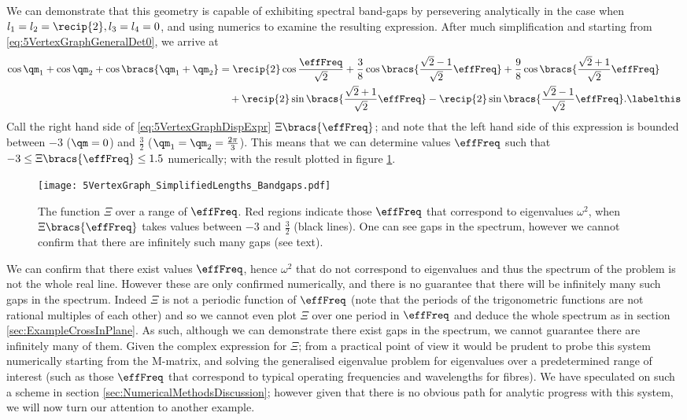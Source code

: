 We can demonstrate that this geometry is capable of exhibiting spectral band-gaps by persevering analytically in the case when $l_1=l_2=\recip{2}, l_3=l_4=0$, and using numerics to examine the resulting expression.
After much simplification and starting from \eqref{eq:5VertexGraphGeneralDet0}, we arrive at
\begin{align*} 
	\cos\qm_1 + \cos\qm_2 + \cos\bracs{\qm_1+\qm_2} &=
	\recip{2}\cos\frac{\effFreq}{\sqrt{2}}
	+ \frac{3}{8}\cos\bracs{\frac{\sqrt{2}-1}{\sqrt{2}}\effFreq}
	+ \frac{9}{8}\cos\bracs{\frac{\sqrt{2}+1}{\sqrt{2}}\effFreq} \\
	&\quad + \recip{2}\sin\bracs{\frac{\sqrt{2}+1}{\sqrt{2}}\effFreq}
	- \recip{2}\sin\bracs{\frac{\sqrt{2}-1}{\sqrt{2}}\effFreq}. \labelthis\label{eq:5VertexGraphDispExpr}
\end{align*}
Call the right hand side of \eqref{eq:5VertexGraphDispExpr} $\Xi\bracs{\effFreq}$; and note that the left hand side of this expression is bounded between $-3$ ($\qm=0$) and $\frac{3}{2}$ ($\qm_1=\qm_2=\frac{2\pi}{3}$).
This means that we can determine values $\effFreq$ such that $-3\leq \Xi\bracs{\effFreq} \leq 1.5$ numerically; with the result plotted in figure \ref{fig:5VertexGraph_SimplifiedLengths_Bandgaps}.
\begin{figure}[t]
	\centering
	\texttt{[image: 5VertexGraph\_SimplifiedLengths\_Bandgaps.pdf]}
	\caption{\label{fig:5VertexGraph_SimplifiedLengths_Bandgaps} The function $\Xi$ over a range of $\effFreq$. Red regions indicate those $\effFreq$ that correspond to eigenvalues $\omega^2$, when $\Xi\bracs{\effFreq}$ takes values between $-3$ and $\frac{3}{2}$ (black lines). One can see gaps in the spectrum, however we cannot confirm that there are infinitely such many gaps (see text).}
\end{figure}
We can confirm that there exist values $\effFreq$, hence $\omega^2$ that do not correspond to eigenvalues and thus the spectrum of the problem is not the whole real line.
However these are only confirmed numerically, and there is no guarantee that there will be infinitely many such gaps in the spectrum.
Indeed $\Xi$ is not a periodic function of $\effFreq$ (note that the periods of the trigonometric functions are not rational multiples of each other) and so we cannot even plot $\Xi$ over one period in $\effFreq$ and deduce the whole spectrum as in section \ref{sec:ExampleCrossInPlane}.
As such, although we can demonstrate there exist gaps in the spectrum, we cannot guarantee there are infinitely many of them.
Given the complex expression for $\Xi$; from a practical point of view it would be prudent to probe this system numerically starting from the M-matrix, and solving the generalised eigenvalue problem for eigenvalues over a predetermined range of interest (such as those $\effFreq$ that correspond to typical operating frequencies and wavelengths for fibres).
We have speculated on such a scheme in section \ref{sec:NumericalMethodsDiscussion}; however given that there is no obvious path for analytic progress with this system, we will now turn our attention to another example.

